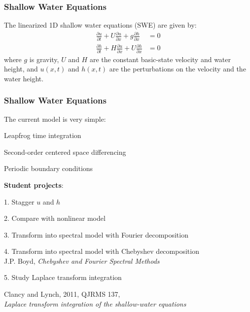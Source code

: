\documentclass[aspectratio=43,9pt]{beamer}
\begin{document}
%
%
\begin{frame}
	\frametitle{Shallow Water Equations}
	The linearized 1D shallow water equations (SWE) are given by:
	\begin{align*}
		\frac{\partial u}{\partial t}+U\frac{\partial u}{\partial x}+g\frac{\partial h}{\partial x}&=0\\
		\frac{\partial h}{\partial t}+H\frac{\partial u}{\partial x}+U\frac{\partial h}{\partial x}&=0
	\end{align*}
	where $g$ is gravity, $U$ and $H$ are the constant basic-state velocity and water height, and $u(x,t)$ and $h(x,t)$ are the perturbations on the velocity and the water height.
\end{frame}
%
%
\begin{frame}
	\frametitle{Shallow Water Equations}
	The current model is very simple:
	\begin{myitemize}{1ex}
		\item Leapfrog time integration
		\item Second-order centered space differencing
		\item Periodic boundary conditions
	\end{myitemize}
	{\vspace*{4ex}\bfseries Student projects}:
	\begin{myitemize}{1ex}
		\item[1.] Stagger $u$ and $h$
		\item[2.] Compare with nonlinear model
		\item[3.] Transform into spectral model with Fourier decomposition
		\item[4.] Transform into spectral model with Chebyshev decomposition\\[1mm]
			\quad J.P. Boyd, \emph{Chebyshev and Fourier Spectral Methods}\\
		\item[5.] Study Laplace transform integration\\[1mm]
			\quad\parbox{.9\textwidth}{Clancy and Lynch, 2011, QJRMS 137,\\\emph{Laplace transform integration of the shallow-water equations}}\\[1mm]
	\end{myitemize}
\end{frame}
\end{document}
